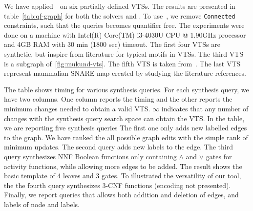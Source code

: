 We have applied~\ourtool~on six partially defined VTSs.
%
The results are presented in table~\ref{tab:qf-graph} for both the solvers
\depqbf and \zthree.
%
To use~\zthree, we remove \texttt{Connected} constraints, such that the queries becomes
quantifier free.
%
%
The experiments were done on a machine with Intel(R) Core(TM) i3-4030U
CPU @ 1.90GHz processor and 4GB RAM with 30 min (1800 sec) timeout.
%
The first four VTSs are synthetic, but inspire from literature for
typical motifs in VTSs. The third VTS is a subgraph of~\ref{fig:mukund-vts}.
%
%
The fifth VTS is taken from~\cite{burri2004complete}.
%
The last VTS represent mammalian SNARE map created by studying the literature references.  

The table shows timing for various synthesis queries.
%
For each synthesis query, we have two columns.
%
One column reports the timing and the other reports the minimum changes
needed to obtain a valid VTS.
%
$\infty$ indicates that any number of changes with the synthesis query
search space can obtain the VTS.
%
In the table, we are reporting five synthesis queries
%
The first one only adds new labelled edges to the graph.
%
We have ranked the all possible graph edits with the simple rank of
minimum updates.
%
The second query adds new labels to the edge.
%
The third query synthesizes NNF Boolean functions only containing
$\land$ and $\lor$ gates for activity functions, while allowing
more edges to be added.
%
The result shows the basic template of 4 leaves and 3 gates.
%
%
To illustrated the versatility of our tool, the the fourth query
synthesizes $3$-CNF functions (encoding not presented).
%
Finally, we report queries that allows both addition and deletion of edges, and labels
of node and labels. 


%
%

